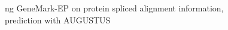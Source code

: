 \documentclass[a4paper,10pt]{report}
\begin{document}
\begin{figure}
\begin{center}
ng GeneMark-EP on protein spliced alignment information, prediction with AUGUSTUS
\end{center}
\end{figure}
\end{document}
